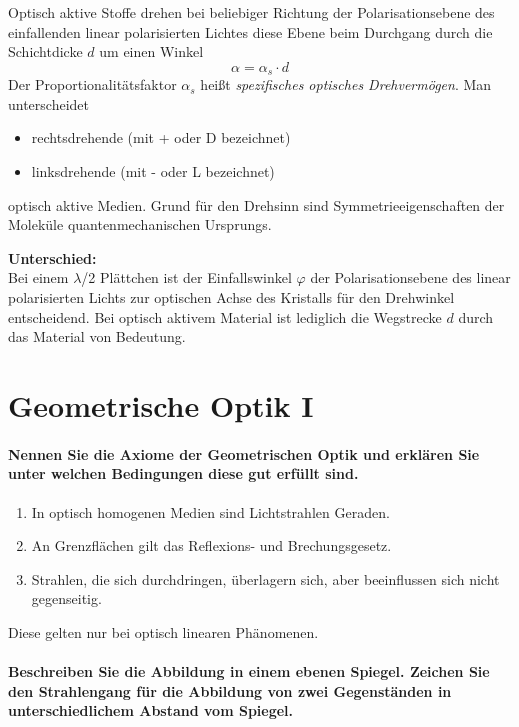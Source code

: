 \documentclass[a4paper, 11pt, ngerman, parskip=half-]{scrartcl}
\begin{document}
Optisch aktive Stoffe drehen bei beliebiger Richtung der Polarisationsebene des einfallenden linear polarisierten Lichtes diese Ebene beim Durchgang durch die Schichtdicke $d$ um einen Winkel
%
\[\alpha = \alpha_s \cdot d\]
%
Der Proportionalitätsfaktor $\alpha_s$ heißt \textit{spezifisches optisches Drehvermögen}. Man unterscheidet
\begin{itemize}
    \item rechtsdrehende (mit + oder D bezeichnet)
    \item linksdrehende (mit - oder L bezeichnet)
\end{itemize}
optisch aktive Medien. Grund für den Drehsinn sind Symmetrieeigenschaften der Moleküle quantenmechanischen Ursprungs.

\textbf{Unterschied:}\\
Bei einem $\lambda$/2 Plättchen ist der Einfallswinkel $\varphi$ der Polarisationsebene des linear polarisierten Lichts
zur optischen Achse des Kristalls für den Drehwinkel entscheidend. Bei optisch aktivem Material ist lediglich die Wegstrecke $d$
durch das Material von Bedeutung.

\newpage

\section{Geometrische Optik I}


\paragraph{Nennen Sie die Axiome der Geometrischen Optik und erklären Sie unter welchen Bedingungen
    diese gut erfüllt sind.}

\begin{enumerate}
    \item In optisch homogenen Medien sind Lichtstrahlen Geraden.
    \item An Grenzflächen gilt das Reflexions- und Brechungsgesetz.
    \item Strahlen, die sich durchdringen, überlagern sich, aber beeinflussen sich nicht gegenseitig.
\end{enumerate}

Diese gelten nur bei optisch linearen Phänomenen.

\paragraph{Beschreiben Sie die Abbildung in einem ebenen Spiegel. Zeichen Sie den Strahlengang für
    die Abbildung von zwei Gegenständen in unterschiedlichem Abstand vom Spiegel.}
\end{document}
